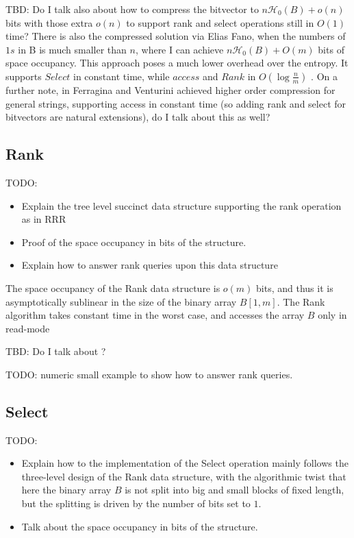\noindent TBD: Do I talk also about how to compress the bitvector to $n \mathcal{H}_0(B) + o(n)$ bits with those extra $o(n)$ to support rank and select operations still in $O(1)$ time? There is also the compressed solution via Elias Fano, when the numbers of $1s$ in B is much smaller than $n$, where I can achieve $n\mathcal{H}_0(B) + O(m)$ bits of space occupancy. This approach poses a much lower overhead over the entropy. It supports $Select$ in constant time, while $access$ and $Rank$ in $O(\log \frac{n}{m})$ \cite{navarro2016compact,ferragina2023pearls}. On a further note, in \cite{FERRAGINA2007115} Ferragina and Venturini achieved higher order compression for general strings, supporting access in constant time (so adding rank and select for bitvectors are natural extensions), do I talk about this as well?

\subsection{Rank}
TODO:
\begin{itemize}
    \item Explain the tree level succinct data structure supporting the rank operation as in RRR \cite{RRR2002}
    \item Proof of the space occupancy in bits of the structure. \cite{ferragina2023pearls}
    \item Explain how to answer rank queries upon this data structure \cite{ferragina2023pearls,navarro2016compact}
\end{itemize}
\begin{theorem}
    The space occupancy of the Rank data structure is $o(m)$ bits, and thus it is asymptotically sublinear in the size of the binary array $B[1, m]$. The Rank algorithm takes constant time in the worst case, and accesses the array $B$ only in read-mode
\end{theorem}
TBD: Do I talk about \cite{grossi2009haste}?
\begin{example}
    TODO: numeric small example to show how to answer rank queries.
\end{example}

\subsection{Select}
TODO:
\begin{itemize}
    \item Explain how to the implementation of the Select operation mainly follows the three-level design of the Rank data structure, with the algorithmic twist that here the binary array $B$ is not split into big and small blocks of fixed length, but the splitting is driven by the number of bits set to $1$. \cite{ferragina2023pearls,navarro2016compact}
    \item Talk about the space occupancy in bits of the structure. \cite{ferragina2023pearls,navarro2016compact}
\end{itemize}

